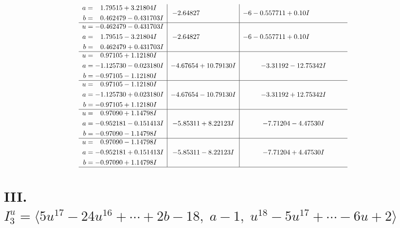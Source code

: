 \documentclass[1p]{elsarticle_modified}
\theoremstyle{definition}
\begin{document}
$$\begin{array}{c|c|c}
\begin{aligned}
a &= \phantom{-}1.79515 + 3.21804 I \\
b &= \phantom{-}0.462479 - 0.431703 I\end{aligned}
 & -2.64827\phantom{ +0.000000I} &                  -6
-0.557711 + 0. 10   I\phantom{ +0.000000I} \\ \hline\begin{aligned}
u &= -0.462479 - 0.431703 I \\
a &= \phantom{-}1.79515 - 3.21804 I \\
b &= \phantom{-}0.462479 + 0.431703 I\end{aligned}
 & -2.64827\phantom{ +0.000000I} &                  -6
-0.557711 + 0. 10   I\phantom{ +0.000000I} \\ \hline\begin{aligned}
u &= \phantom{-}0.97105 + 1.12180 I \\
a &= -1.125730 - 0.023180 I \\
b &= -0.97105 - 1.12180 I\end{aligned}
 & -4.67654 + 10.79130 I & -3.31192 - 12.75342 I \\ \hline\begin{aligned}
u &= \phantom{-}0.97105 - 1.12180 I \\
a &= -1.125730 + 0.023180 I \\
b &= -0.97105 + 1.12180 I\end{aligned}
 & -4.67654 - 10.79130 I & -3.31192 + 12.75342 I \\ \hline\begin{aligned}
u &= \phantom{-}0.97090 + 1.14798 I \\
a &= -0.952181 - 0.151413 I \\
b &= -0.97090 - 1.14798 I\end{aligned}
 & -5.85311 + 8.22123 I & -7.71204 - 4.47530 I \\ \hline\begin{aligned}
u &= \phantom{-}0.97090 - 1.14798 I \\
a &= -0.952181 + 0.151413 I \\
b &= -0.97090 + 1.14798 I\end{aligned}
 & -5.85311 - 8.22123 I & -7.71204 + 4.47530 I\\
 \hline 
 \end{array}$$\newpage\newpage\renewcommand{\arraystretch}{1}
\centering \section*{III. $I^u_{3}= \langle 5 u^{17}-24 u^{16}+\cdots+2 b-18,\;a-1,\;u^{18}-5 u^{17}+\cdots-6 u+2 \rangle$}
\end{document}
